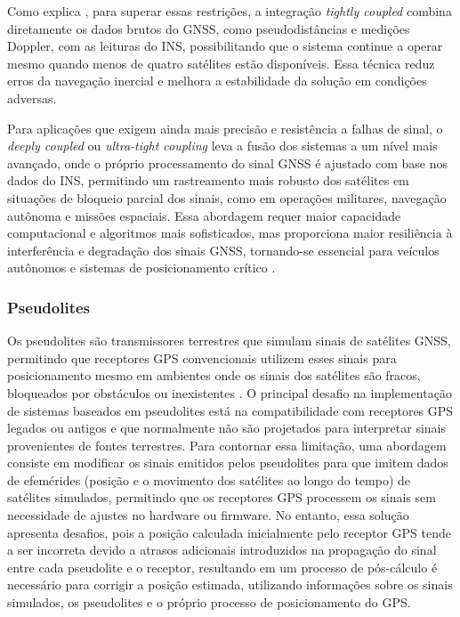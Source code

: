 Como explica \cite{falco2017}, para superar essas restrições, a integração \textit{tightly coupled} combina diretamente os dados brutos do GNSS, como pseudodistâncias e medições Doppler, com as leituras do INS, possibilitando que o sistema continue a operar mesmo quando menos de quatro satélites estão disponíveis. Essa técnica reduz erros da navegação inercial e melhora a estabilidade da solução em condições adversas. 

Para aplicações que exigem ainda mais precisão e resistência a falhas de sinal, o \textit{deeply coupled} ou \textit{ultra-tight coupling} leva a fusão dos sistemas a um nível mais avançado, onde o próprio processamento do sinal GNSS é ajustado com base nos dados do INS, permitindo um rastreamento mais robusto dos satélites em situações de bloqueio parcial dos sinais, como em operações militares, navegação autônoma e missões espaciais. Essa abordagem requer maior capacidade computacional e algoritmos mais sofisticados, mas proporciona maior resiliência à interferência e degradação dos sinais GNSS, tornando-se essencial para veículos autônomos e sistemas de posicionamento crítico \cite{falco2017}. 

\subsubsection{Pseudolites}

Os pseudolites são transmissores terrestres que simulam sinais de satélites GNSS, permitindo que receptores GPS convencionais utilizem esses sinais para posicionamento mesmo em ambientes onde os sinais dos satélites são fracos, bloqueados por obstáculos ou inexistentes \cite{kim2014}. O principal desafio na implementação de sistemas baseados em pseudolites está na compatibilidade com receptores GPS legados ou antigos e que normalmente não são projetados para interpretar sinais provenientes de fontes terrestres. Para contornar essa limitação, uma abordagem consiste em modificar os sinais emitidos pelos pseudolites para que imitem dados de efemérides (posição e o movimento dos satélites ao longo do tempo) de satélites simulados, permitindo que os receptores GPS processem os sinais sem necessidade de ajustes no hardware ou firmware.
No entanto, essa solução apresenta desafios, pois a posição calculada inicialmente pelo receptor GPS tende a ser incorreta devido a atrasos adicionais introduzidos na propagação do sinal entre cada pseudolite e o receptor, resultando em um processo de pós-cálculo é necessário para corrigir a posição estimada, utilizando informações sobre os sinais simulados, os pseudolites e o próprio processo de posicionamento do GPS.

